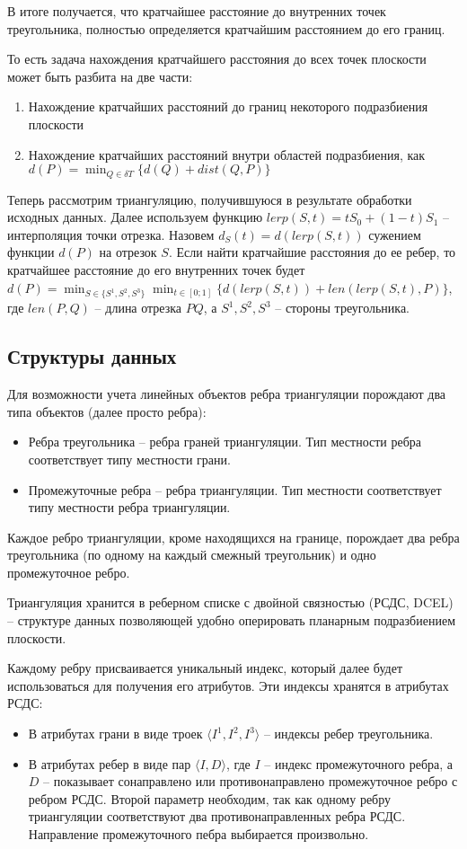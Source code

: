 В итоге получается, что кратчайшее расстояние до внутренних точек треугольника,
полностью определяется кратчайшим расстоянием до его границ.

То есть задача нахождения кратчайшего расстояния до всех точек плоскости
может быть разбита на две части:
\begin{enumerate}
\item Нахождение кратчайших расстояний до границ некоторого подразбиения плоскости
\item Нахождение кратчайших расстояний внутри областей подразбиения, как
$d(P) = \min_{Q \in \delta T} \{d(Q) + dist(Q, P)\}$
\end{enumerate}

Теперь рассмотрим триангуляцию, получившуюся в результате обработки исходных данных.
Далее используем функцию $lerp(S, t) = tS_0 + (1-t)S_1$ -- интерполяция точки отрезка.
Назовем $d_S(t) = d(lerp(S, t))$ сужением функции $d(P)$ на отрезок $S$.
Если найти кратчайшие расстояния до ее ребер, то кратчайшее расстояние до
его внутренних точек будет
$d(P) = \min_{S \in \{S^1, S^2, S^3\} } \min_{t \in [0; 1] } \{d(lerp(S, t)) + len(lerp(S, t), P)\}$,
где $len(P, Q)$ -- длина отрезка $PQ$, а $S^1, S^2, S^3$ -- стороны треугольника.

\subsection{Структуры данных}
Для возможности учета линейных объектов ребра триангуляции порождают
два типа объектов (далее просто ребра):
\begin{itemize}
\item Ребра треугольника -- ребра граней триангуляции.
Тип местности ребра соответствует типу местности грани.
\item Промежуточные ребра -- ребра триангуляции.
Тип местности соответствует типу местности ребра триангуляции.
\end{itemize}
Каждое ребро триангуляции, кроме находящихся на границе, порождает
два ребра треугольника (по одному на каждый смежный треугольник)
и одно промежуточное ребро.

Триангуляция хранится в реберном списке с двойной связностью
(РСДС, DCEL) -- структуре данных позволяющей удобно оперировать
планарным подразбиением плоскости.

Каждому ребру присваивается уникальный индекс, который далее
будет использоваться для получения его атрибутов.
Эти индексы хранятся в атрибутах РСДС:
\begin{itemize}
\item В атрибутах грани в виде троек $\langle I^1, I^2, I^3 \rangle$ --
индексы ребер треугольника.
\item В атрибутах ребер  в виде пар $\langle I, D \rangle$, где $I$ --
индекс промежуточного ребра, а $D$ -- показывает сонаправлено или
противонаправлено промежуточное ребро с ребром РСДС. Второй
параметр необходим, так как одному ребру триангуляции соответствуют
два противонаправленных ребра РСДС. Направление промежуточного пебра
выбирается произвольно.
\end{itemize}

